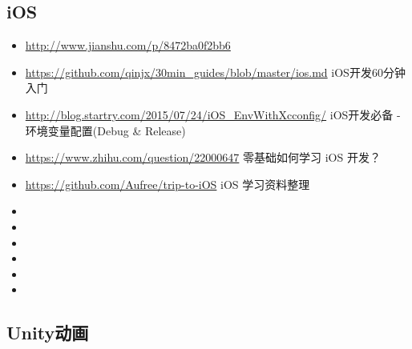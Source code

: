 \documentclass[9pt, b5paper]{article}
\begin{document}
\subsection{iOS}
\label{sec:org3c8c8ae}
\begin{itemize}
\item \url{http://www.jianshu.com/p/8472ba0f2bb6}
\item \url{https://github.com/qinjx/30min\_guides/blob/master/ios.md} iOS开发60分钟入门
\item \url{http://blog.startry.com/2015/07/24/iOS\_EnvWithXcconfig/} iOS开发必备 - 环境变量配置(Debug \& Release)
\item \url{https://www.zhihu.com/question/22000647} 零基础如何学习 iOS 开发？
\item \url{https://github.com/Aufree/trip-to-iOS} iOS 学习资料整理
\item 

\item 

\item 

\item 

\item 

\item 
\end{itemize}
\subsection{Unity动画}
\label{sec:org4c0836e}
\end{document}
